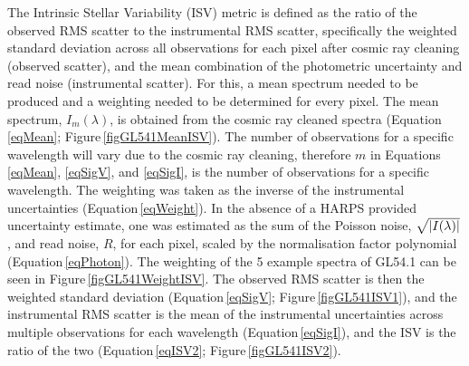 The Intrinsic Stellar Variability (ISV) metric is defined as the ratio of the observed RMS scatter to the instrumental RMS scatter, specifically the weighted standard deviation across all observations for each pixel after cosmic ray cleaning (observed scatter), and the mean combination of the photometric uncertainty and read noise (instrumental scatter). For this, a mean spectrum needed to be produced and a weighting needed to be determined for every pixel. The mean spectrum, $I_{m}(\lambda)$, is obtained from the cosmic ray cleaned spectra (Equation\,\ref{eqMean}; Figure\,\ref{figGL541MeanISV}). The number of observations for a specific wavelength will vary due to the cosmic ray cleaning, therefore $m$ in Equations\,\ref{eqMean}, \ref{eqSigV}, and \ref{eqSigI}, is the number of observations for a specific wavelength. The weighting was taken as the inverse of the instrumental uncertainties (Equation\,\ref{eqWeight}). In the absence of a HARPS provided uncertainty estimate, one was estimated as the sum of the Poisson noise, $\sqrt{\abs{I(\lambda)}}$, and read noise, $R$, for each pixel, scaled by the normalisation factor polynomial (Equation\,\ref{eqPhoton}). The weighting of the 5 example spectra of GL54.1 can be seen in Figure\,\ref{figGL541WeightISV}. The observed RMS scatter is then the weighted standard deviation (Equation\,\ref{eqSigV}; Figure\,\ref{figGL541ISV1}), and the instrumental RMS scatter is the mean of the instrumental uncertainties across multiple observations for each wavelength (Equation\,\ref{eqSigI}), and the ISV is the ratio of the two (Equation\,\ref{eqISV2}; Figure\,\ref{figGL541ISV2}). 





